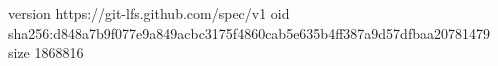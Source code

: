 version https://git-lfs.github.com/spec/v1
oid sha256:d848a7b9f077e9a849acbc3175f4860cab5e635b4ff387a9d57dfbaa20781479
size 1868816

